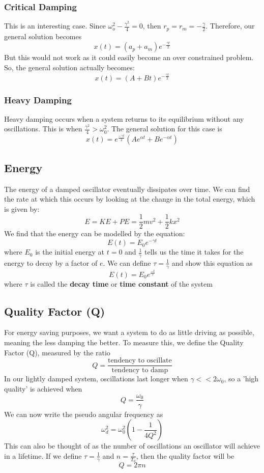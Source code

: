 \documentclass[11pt]{article}
\begin{document}
\subsubsection{Critical Damping}
This is an interesting case. Since $\omega_o^2 - \frac{\gamma^2}{4} = 0$, then $r_p = r_m = -\frac{\gamma}{2}$. Therefore, our general solution becomes
$$ x(t) = (a_p + a_m)e^{-\frac{\gamma t}{2}}$$ But this would not work as it could easily become an over constrained problem. So, the general solution actually becomes:
$$ x(t) = (A+Bt)e^{-\frac{\gamma t}{2}}$$
\subsubsection{Heavy Damping}
Heavy damping occurs when a system returns to its equilibrium without any oscillations. This is when $\frac{\gamma^2}{4} > \omega_0^2$. The general solution for this case is 
$$x(t) = e^{\frac{-\gamma t}{2}}(Ae^{\alpha t} + Be^{-\alpha t})$$
\subsection{Energy}
The energy of a damped oscillator eventually dissipates over time. We can find the rate at which this occurs by looking at the change in the total energy, which is given by: $$ E = KE + PE = \frac{1}{2}mv^2 + \frac{1}{2}kx^2$$ We find that the energy can be modelled by the equation:
$$E(t) = E_0e^{-\gamma t}$$
where $E_0$ is the initial energy at $t=0$ and $\frac{1}{\gamma}$ tells us the time it takes for the energy to decay by a factor of $e$. We can define $\tau = \frac{1}{\gamma}$ and show this equation as 
$$ E(t) = E_0e^{\frac{-t}{\tau}}$$ where $\tau$ is called the \textbf{decay time} or \textbf{time constant} of the system
\subsection{Quality Factor (Q)}
For energy saving purposes, we want a system to do as little driving as possible, meaning the less damping the better. To measure this, we define the Quality Factor (Q), measured by the ratio
$$Q = \frac{\text{tendency to oscillate}}{\text{tendency to damp}}$$
In our lightly damped system, oscillations last longer when $\gamma << 2\omega_0$, so a 'high quality' is achieved when $$ Q = \frac{\omega_0}{\gamma}$$
We can now write the pseudo angular frequency as 
$$ \omega_d^2 = \omega_0^2(1 - \frac{1}{4Q^2})$$
This can also be thought of as the number of oscillations an oscillator will achieve in a lifetime. If we define $\tau = \frac{1}{\gamma}$ and $n=\frac{\tau}{T_0}$, then the quality factor will be $$Q = 2\pi n$$
\pagebreak
\end{document}
